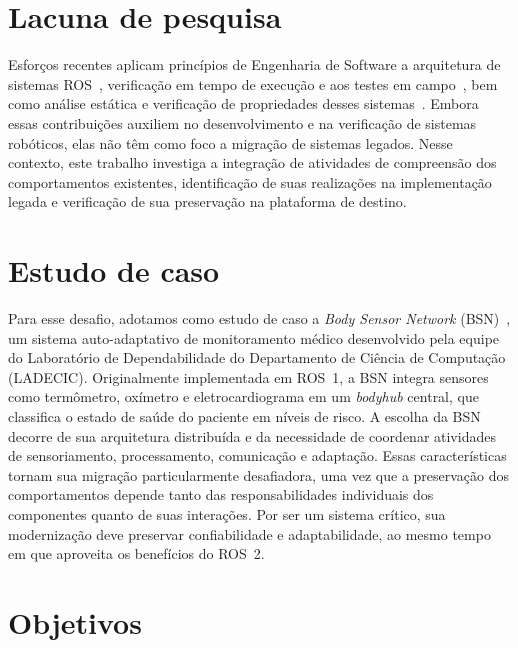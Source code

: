 \section{Lacuna de pesquisa}

Esforços recentes aplicam princípios de Engenharia de Software a arquitetura de sistemas ROS~\cite{malavolta2020}, verificação em tempo de execução e aos testes em campo~\cite{caldas2024runtime}, bem como análise estática e verificação de propriedades desses sistemas~\cite{santos2021high}.
Embora essas contribuições auxiliem no desenvolvimento e na verificação de sistemas robóticos, elas não têm como foco a migração de sistemas legados. Nesse contexto, este trabalho investiga a integração de atividades de compreensão dos comportamentos existentes, identificação de suas realizações na implementação legada e verificação de sua preservação na plataforma de destino.

\section{Estudo de caso}

Para esse desafio, adotamos como estudo de caso a \textit{Body Sensor Network} (BSN)~\cite{Gil2021BodySN}, um sistema auto-adaptativo de monitoramento médico desenvolvido pela equipe do Laboratório de Dependabilidade do Departamento de Ciência de Computação (LADECIC).
Originalmente implementada em ROS~1, a BSN integra sensores como termômetro, oxímetro e eletrocardiograma em um \textit{bodyhub} central, que classifica o estado de saúde do paciente em níveis de risco.
A escolha da BSN decorre de sua arquitetura distribuída e da necessidade de coordenar atividades de sensoriamento, processamento, comunicação e adaptação. Essas características tornam sua migração particularmente desafiadora, uma vez que a preservação dos comportamentos depende tanto das responsabilidades individuais dos componentes quanto de suas interações. Por ser um sistema crítico, sua modernização deve preservar confiabilidade e adaptabilidade, ao mesmo tempo em que aproveita os benefícios do ROS~2.

\section{Objetivos}

